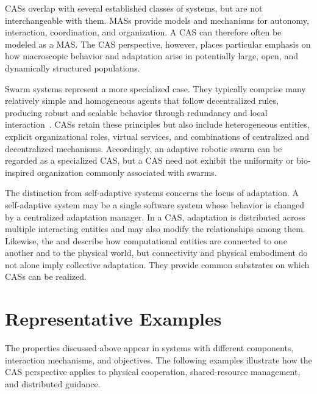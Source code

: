 \glspl{CAS} overlap with several established classes of systems,
 but are not interchangeable with them. 
%
\glspl{MAS} provide models and mechanisms
 for autonomy, interaction, coordination, and organization. 
% 
A \gls{CAS} can therefore often be modeled as a \gls{MAS}. 
%
The \gls{CAS} perspective, however, 
 places particular emphasis on how macroscopic behavior 
 and adaptation arise in potentially large, open, and dynamically structured populations.

Swarm systems represent a more specialized case. 
%
They typically comprise many relatively simple 
 and homogeneous agents that follow decentralized rules,
 producing robust and scalable behavior through redundancy 
 and local interaction~\cite{DBLP:journals/swarm/BrambillaFBD13}. 
% 
\glspl{CAS} retain these principles but also include heterogeneous entities, 
 explicit organizational roles, virtual services, and combinations of centralized 
 and decentralized mechanisms. 
% 
Accordingly, 
 an adaptive robotic swarm can be regarded as a specialized \gls{CAS}, 
 but a \gls{CAS} need not exhibit the uniformity 
 or bio-inspired organization commonly associated with swarms.

The distinction from self-adaptive systems concerns the locus of adaptation. 
%
A self-adaptive system may be a single software system 
 whose behavior is changed by a centralized adaptation manager. 
% 
In a \gls{CAS}, 
 adaptation is distributed across multiple interacting entities 
 and may also modify the relationships among them.
%
Likewise, 
 the  and  describe how computational entities are connected 
 to one another and to the physical world, but connectivity and physical embodiment do not alone imply 
 collective adaptation. 
%
They provide common substrates on which \glspl{CAS} can be realized.

\section{Representative Examples}
\label{sec:cas-examples}

The properties discussed above appear in systems with different components,
 interaction mechanisms, and objectives.
%
The following examples illustrate how the CAS perspective applies to physical cooperation, 
 shared-resource management, and distributed guidance.

